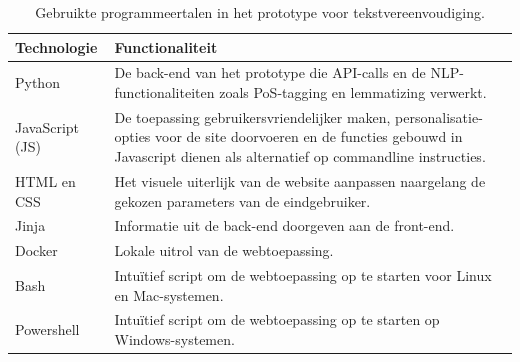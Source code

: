 \begin{center}
	\begin{table}[H]
	\begin{tabular}{ | m{4cm} | m{11cm} | } 
		\hline
		\textbf{Technologie} 	& \textbf{Functionaliteit} \\
		\hline
		Python 					& De back-end van het prototype die API-calls en de NLP-functionaliteiten zoals PoS-tagging en lemmatizing verwerkt. \\
		\hline
		JavaScript (JS)				& De toepassing gebruikersvriendelijker maken, personalisatie-opties voor de site doorvoeren en de functies gebouwd in Javascript dienen als alternatief op commandline instructies. \\
		\hline
		HTML en CSS 			& Het visuele uiterlijk van de website aanpassen naargelang de gekozen parameters van de eindgebruiker. \\
		\hline
		Jinja 					& Informatie uit de back-end doorgeven aan de front-end.  \\
		\hline
		Docker 					& Lokale uitrol van de webtoepassing. \\
		\hline
		Bash					& Intuïtief script om de webtoepassing op te starten voor Linux en Mac-systemen. \\
		\hline
		Powershell 				& Intuïtief script om de webtoepassing op te starten op Windows-systemen. \\
		\hline
	\end{tabular}
	\caption{Gebruikte programmeertalen in het prototype voor tekstvereenvoudiging.}
	\label{table:technologies}
	\end{table}
\end{center}


